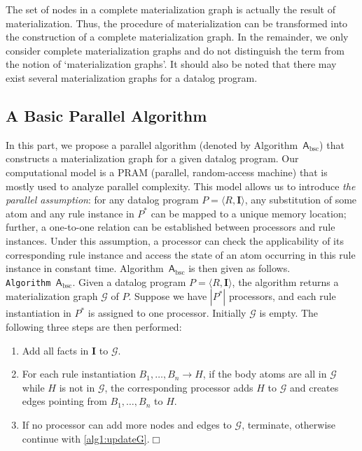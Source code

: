 The set of nodes in a complete materialization graph is actually the result
of materialization.
Thus, the procedure of materialization can be transformed into the construction of
a complete materialization graph.
In the remainder, we only consider complete materialization graphs and
do not distinguish the term from the
notion of `materialization graphs'.
It should also be noted that there may exist several materialization graphs for a datalog program.


\subsection{A Basic Parallel Algorithm}
\label{sec:alg-bsc}

In this part, we propose a parallel algorithm
(denoted by Algorithm~$\mathsf{A}_{\text{bsc}}$) that constructs a materialization graph for a given datalog program.
Our computational model is a PRAM (parallel, random-access machine) that is mostly used to analyze parallel
complexity. This model allows us to introduce \emph{the parallel assumption}:
for any datalog program $P=\langle R, \textbf{I}\rangle$,
any substitution of some atom and any rule instance in $P^*$ can be mapped to a unique memory
location; further, a one-to-one relation can be established between processors and rule instances.
Under this assumption, a processor can check the applicability of its corresponding
rule instance and access the state of an atom occurring in this rule instance in constant time.
Algorithm~$\mathsf{A}_{\text{bsc}}$ is then given as follows.\\


\noindent\texttt{Algorithm~$\mathsf{A}_{\text{bsc}}$}. Given a datalog program $P=\langle R, \textbf{I}\rangle$,
the algorithm returns a materialization graph $\mathcal{G}$ of $P$.
Suppose we have $|P^*|$ processors, and each rule instantiation in $P^*$ is
assigned to one processor.
Initially $\mathcal{G}$ is empty. The following three steps are then performed:
\begin{enumerate}[leftmargin=8ex,label=(\textit{Step \arabic*}),ref=Step~\arabic*]
\item Add all facts in $\textbf{I}$ to $\mathcal{G}$.\label{alg1:addFacts}
\item For each rule instantiation $B_1,\ldots,B_n\rightarrow H$, if the body atoms are all
    in $\mathcal{G}$ while $H$ is not in $\mathcal{G}$,
    the corresponding processor adds $H$ to $\mathcal{G}$ and creates edges pointing
    from $B_1,\ldots,B_n$ to $H$.\label{alg1:updateG}
\item If no processor can add more nodes and edges to $\mathcal{G}$,
  terminate, otherwise continue with \ref{alg1:updateG}.\label{alg1:halt}\hfill$\Box$
\end{enumerate}

